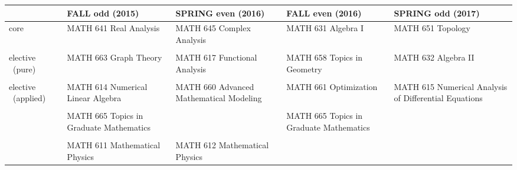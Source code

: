 \documentclass[12pt]{report}
\begin{document}
\pagestyle{empty}

\small
\begin{center}
\begin{tabular}{| p{1.6cm} || p{4.0cm} | p{4.0cm} | p{4.0cm} | p{4.0cm} |}

\hline
& \textbf{FALL odd (2015)} & \textbf{SPRING even (2016)} & \textbf{FALL even (2016)} & \textbf{SPRING odd (2017)} \\
\hline\hline
core & MATH 641 Real Analysis & MATH 645 Complex Analysis & MATH 631 Algebra I & MATH 651 Topology \\
&  &&&\\
\hline
elective 
~(pure) & MATH 663 Graph Theory & MATH 617 Functional Analysis & MATH 658 Topics in Geometry & MATH 632 Algebra II \\
&  &&  & \\
\hline
elective 
~(applied) & MATH 614 Numerical Linear Algebra & MATH 660 Advanced Mathematical Modeling & MATH 661 Optimization & MATH 615 Numerical Analysis of Differential Equations \\
&  &&  & \\
\hline
& MATH 665 Topics in Graduate Mathematics && MATH 665 Topics in Graduate Mathematics&\\
&  &&  &\\
\hline
& MATH 611 Mathematical Physics & MATH 612 Mathematical Physics&& \\
\hline
\end{tabular}
\end{center}
\end{document}
